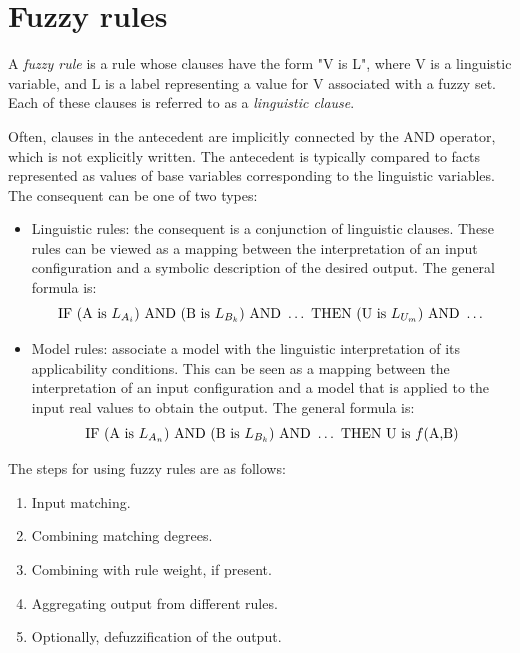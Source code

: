 \section{Fuzzy rules}

\begin{definition}
    A \emph{fuzzy rule} is a rule whose clauses have the form "V is L", where V is a linguistic variable, and L is a label representing a value for V associated with a fuzzy set.
    Each of these clauses is referred to as a \emph{linguistic clause}. 
\end{definition}
Often, clauses in the antecedent are implicitly connected by the AND operator, which is not explicitly written.
The antecedent is typically compared to facts represented as values of base variables corresponding to the linguistic variables. 
The consequent can be one of two types:
\begin{itemize}
    \item Linguistic rules: the consequent is a conjunction of linguistic clauses. 
        These rules can be viewed as a mapping between the interpretation of an input configuration and a symbolic description of the desired output. 
        The general formula is:
        \[\textnormal{IF }(\textnormal{A is }L_{A_i})\textnormal{ AND }(\textnormal{B is }L_{B_k})\textnormal{ AND }\dots\textnormal{ THEN }(\textnormal{U is }L_{U_m})\textnormal{ AND }\dots\]
    \item Model rules: associate a model with the linguistic interpretation of its applicability conditions. 
        This can be seen as a mapping between the interpretation of an input configuration and a model that is applied to the input real values to obtain the output. 
        The general formula is:
        \[\textnormal{IF }(\textnormal{A is }L_{A_n})\textnormal{ AND }(\textnormal{B is }L_{B_k})\textnormal{ AND }\dots\textnormal{ THEN } \textnormal{U is } f(\textnormal{A,B})\]
\end{itemize}
The steps for using fuzzy rules are as follows:
\begin{enumerate}
    \item Input matching.
    \item Combining matching degrees.
    \item Combining with rule weight, if present.
    \item Aggregating output from different rules.
    \item Optionally, defuzzification of the output.
\end{enumerate}

